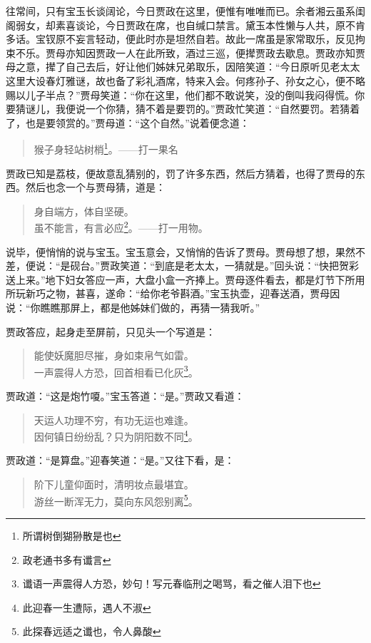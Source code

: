 \documentclass[12pt,oneside]{book}
\newenvironment{shici}{%
\begin{verse}%
\centering\large\hspace{12pt}}%
{\end{verse}}
\begin{document}
往常间，只有宝玉长谈阔论，今日贾政在这里，便惟有唯唯而已。余者湘云虽系闺阁弱女，却素喜谈论，今日贾政在席，也自缄口禁言。黛玉本性懒与人共，原不肯多话。宝钗原不妄言轻动，便此时亦是坦然自若。故此一席虽是家常取乐，反见拘束不乐。贾母亦知因贾政一人在此所致，酒过三巡，便撵贾政去歇息。贾政亦知贾母之意，撵了自己去后，好让他们姊妹兄弟取乐，因陪笑道：“今日原听见老太太这里大设春灯雅谜，故也备了彩礼酒席，特来入会。何疼孙子、孙女之心，便不略赐以儿子半点？”贾母笑道：“你在这里，他们都不敢说笑，没的倒叫我闷得慌。你要猜谜儿，我便说一个你猜，猜不着是要罚的。”贾政忙笑道：“自然要罚。若猜着了，也是要领赏的。”贾母道：“这个自然。”说着便念道：

\begin{shici}
猴子身轻站树梢\footnote{所谓树倒猢狲散是也}。——打一果名
\end{shici}


贾政已知是荔枝，便故意乱猜别的，罚了许多东西，然后方猜着，也得了贾母的东西。然后也念一个与贾母猜，道是：

\begin{shici}
身自端方，体自坚硬。\\
虽不能言，有言必应\footnote{政老通书多有谶言}。——打一用物。

\end{shici}

说毕，便悄悄的说与宝玉。宝玉意会，又悄悄的告诉了贾母。贾母想了想，果然不差，便说：“是砚台。”贾政笑道：“到底是老太太，一猜就是。”回头说：“快把贺彩送上来。”地下妇女答应一声，大盘小盒一齐捧上。贾母逐件看去，都是灯节下所用所玩新巧之物，甚喜，遂命：“给你老爷斟酒。”宝玉执壶，迎春送酒，贾母因说：“你瞧瞧那屏上，都是他姊妹们做的，再猜一猜我听。”

贾政答应，起身走至屏前，只见头一个写道是：

\begin{shici}
能使妖魔胆尽摧，身如束帛气如雷。\\
一声震得人方恐，回首相看已化灰\footnote{谶语一声震得人方恐，妙句！写元春临刑之喝骂，看之催人泪下也}。
\end{shici}


贾政道：“这是炮竹嗄。”宝玉答道：“是。”贾政又看道：

\begin{shici}
天运人功理不穷，有功无运也难逢。\\
因何镇日纷纷乱？只为阴阳数不同\footnote{此迎春一生遭际，遇人不淑}。
\end{shici}

贾政道：“是算盘。”迎春笑道：“是。”又往下看，是：

\begin{shici}
阶下儿童仰面时，清明妆点最堪宜。\\
游丝一断浑无力，莫向东风怨别离\footnote{此探春远适之谶也，令人鼻酸}。
\end{shici}
\end{document}

